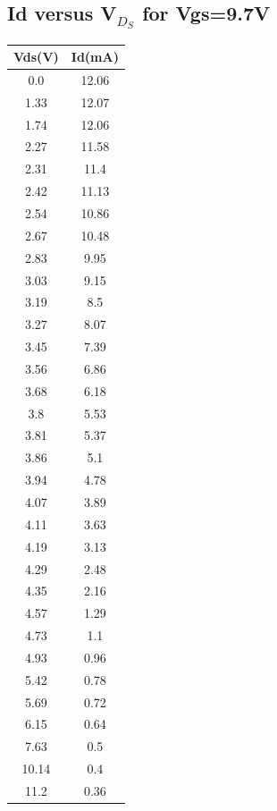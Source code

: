 \subsection{Id versus V$_D_S$ for Vgs=9.7V}
\begin{center}
 \begin{tabular}{|| c | c||} 
 \hline
 Vds(V) & Id(mA) \\ [0.5ex] 
 \hline\hline
 0.0 & 12.06 \\
\hline
1.33 & 12.07 \\
\hline
1.74 & 12.06 \\
\hline
2.27 & 11.58 \\
\hline
2.31 & 11.4 \\
\hline
2.42 & 11.13 \\
\hline
2.54 & 10.86 \\
\hline
2.67 & 10.48 \\
\hline
2.83 & 9.95 \\
\hline
3.03 & 9.15 \\
\hline
3.19 & 8.5 \\
\hline
3.27 & 8.07 \\
\hline
3.45 & 7.39 \\
\hline
3.56 & 6.86 \\
\hline
3.68 & 6.18 \\
\hline
3.8 & 5.53 \\
\hline
3.81 & 5.37 \\
\hline
3.86 & 5.1 \\
\hline
3.94 & 4.78 \\
\hline
4.07 & 3.89 \\
\hline
4.11 & 3.63 \\
\hline
4.19 & 3.13 \\
\hline
4.29 & 2.48 \\
\hline
4.35 & 2.16 \\
\hline
4.57 & 1.29 \\
\hline
4.73 & 1.1 \\
\hline
4.93 & 0.96 \\
\hline
5.42 & 0.78 \\
\hline
5.69 & 0.72 \\
\hline
6.15 & 0.64 \\
\hline
7.63 & 0.5 \\
\hline
10.14 & 0.4 \\
\hline
11.2 & 0.36 \\
\hline

\end{tabular}
\end{center}

